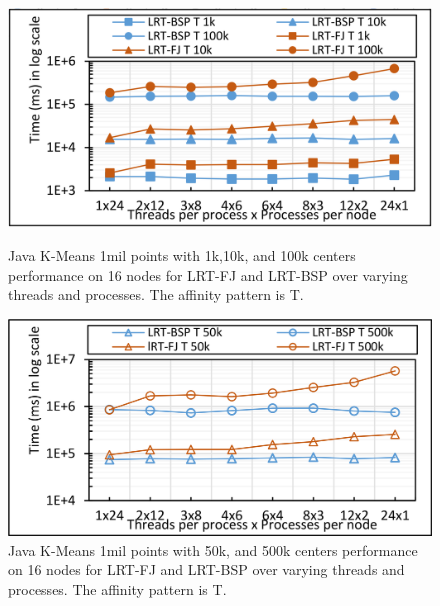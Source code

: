 \documentclass[10pt, conference, compsocconf]{IEEEtran}
\begin{document}
\begin{figure}[!htb]
	\begin{minipage}{0.49\textwidth}
        \centering
        \includegraphics[width=1\columnwidth]{images/fig_kmeans_1mil_varying_centers_by_10k_FJ_vs_BSP_T}
        \caption{Java K-Means 1mil points with 1k,10k, and 100k centers performance on 16 nodes for \ac{LRT-FJ} and \ac{LRT-BSP} over varying threads and processes. The affinity pattern is T.}
        \label{fig:fig_kmeans_1mil_varying_centers_by_10k_FJ_vs_BSP_T}
    \end{minipage}
    \hspace{1.4mm}
    \begin{minipage}{0.49\textwidth}
        \centering
        \includegraphics[width=1\columnwidth]{images/fig_kmeans_1mil_varying_centers_as_50k_500k_FJ_vs_BSP_T}
        \caption{Java K-Means 1mil points with 50k, and 500k centers performance on 16 nodes for \ac{LRT-FJ} and \ac{LRT-BSP} over varying threads and processes. The affinity pattern is T.}
        \label{fig:fig_kmeans_1mil_varying_centers_as_50k_500k_FJ_vs_BSP_T}
    \end{minipage}
\end{figure}
\end{document}
